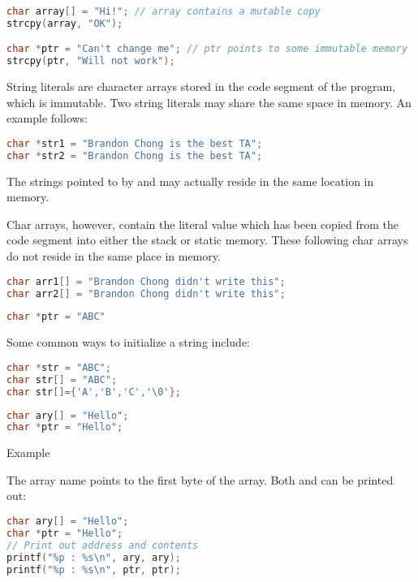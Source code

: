\begin{lstlisting}[language=C]
char array[] = "Hi!"; // array contains a mutable copy 
strcpy(array, "OK");

char *ptr = "Can't change me"; // ptr points to some immutable memory
strcpy(ptr, "Will not work");
\end{lstlisting}

String literals are character arrays stored in the code segment of the program, which is immutable. Two string literals may share the same space in memory. An example follows:

\begin{lstlisting}[language=C]
char *str1 = "Brandon Chong is the best TA";
char *str2 = "Brandon Chong is the best TA";
\end{lstlisting}

The strings pointed to by  and  may actually reside in the same location in memory.

Char arrays, however, contain the literal value which has been copied from the code segment into either the stack or static memory. These following char arrays do not reside in the same place in memory.

\begin{lstlisting}[language=C]
char arr1[] = "Brandon Chong didn't write this";
char arr2[] = "Brandon Chong didn't write this";
\end{lstlisting}

\begin{lstlisting}[language=C]
char *ptr = "ABC"
\end{lstlisting}

Some common ways to initialize a string include:

\begin{lstlisting}[language=C]
char *str = "ABC";
char str[] = "ABC";
char str[]={'A','B','C','\0'};
\end{lstlisting}

\begin{lstlisting}[language=C]
char ary[] = "Hello";
char *ptr = "Hello";
\end{lstlisting}

Example

The array name points to the first byte of the array. Both 
and  can be printed out:

\begin{lstlisting}[language=C]
char ary[] = "Hello";
char *ptr = "Hello";
// Print out address and contents
printf("%p : %s\n", ary, ary);
printf("%p : %s\n", ptr, ptr);
\end{lstlisting}

